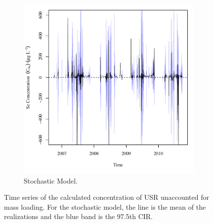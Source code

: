 \begin{linenumbers}
\begin{figure}[htbp]
\begin{subfigure}{0.5\textwidth}
		\includegraphics[width=0.9\linewidth]{"Figures/Results_USR/Stochastic/Balance C"}
		\caption{Stochastic Model.}
	\end{subfigure}
	\caption[Time series of the calculated concentration of USR unaccounted for mass loading.]{Time series of the calculated concentration of USR unaccounted for mass loading.  For the stochastic model, the line is the mean of the realizations and the blue band is the 97.5th CIR.}
	\label{fig:USRConc}
\end{figure}


\end{linenumbers}
